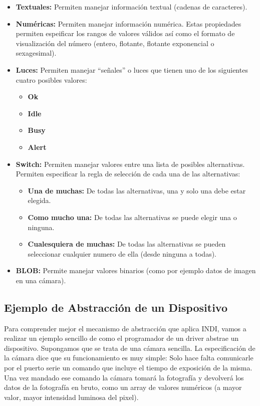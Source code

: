 \begin{itemize}
 \item \textbf{Textuales:} Permiten manejar información textual (cadenas de caracteres).
 
 \item \textbf{Numéricas:} Permiten manejar información numérica. Estas propiedades permiten espeificar los rangos de valores válidos así como el formato de visualización del número (entero, flotante, flotante exponencial o sexagesimal).
 
 \item \textbf{Luces:} Permiten manejar ``señales'' o luces que tienen uno de los siguientes cuatro posibles valores:
   \begin{itemize}
     \item \textbf{Ok}
     \item \textbf{Idle}
     \item \textbf{Busy}
     \item \textbf{Alert}
   \end{itemize}


 \item \textbf{Switch:} Permiten manejar valores entre una lista de posibles alternativas. Permiten especificar la regla de selección de cada una de las alternativas:
   \begin{itemize}
     \item \textbf{Una de muchas:} De todas las alternativas, una y solo una debe estar elegida.
     \item \textbf{Como mucho una:} De todas las alternativas se puede elegir una o ninguna.
     \item \textbf{Cualesquiera de muchas:} De todas las alternativas se pueden seleccionar cualquier numero de ella (desde ninguna a todas).

   \end{itemize}
 \item \textbf{BLOB:} Permite manejar valores binarios (como por ejemplo datos de imagen en una cámara).

\end{itemize}



\subsection{Ejemplo de Abstracción de un Dispositivo}

Para comprender mejor el mecanismo de abstracción que aplica INDI, vamos a realizar un ejemplo sencillo de como el programador de un driver abstrae un dispositivo. Supongamos que se trata de una cámara sencilla. La especificación de la cámara dice que su funcionamiento es muy simple: Solo hace falta comunicarle por el puerto serie un comando que incluye el tiempo de exposición de la misma. Una vez mandado ese comando la cámara tomará la fotografía y devolverá los datos de la fotografía en bruto, como un array de valores numéricos (a mayor valor, mayor intensidad luminosa del pixel).

